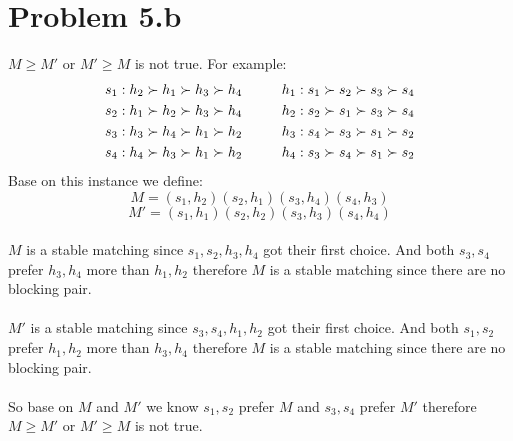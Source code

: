 \documentclass{article}
\newcommand\tab[1][1cm]{\hspace*{#1}}
\begin{document}
\section{Problem 5.b}
 $M \geq M'$ or $M' \geq M$ is not true. For example:\\
\begin{align*}
s_1: h_2 \succ h_1 \succ h_3 \succ h_4 \tab h_1: s_1 \succ s_2 \succ s_3 \succ s_4\\
s_2: h_1 \succ h_2 \succ h_3 \succ h_4 \tab h_2: s_2 \succ s_1 \succ s_3 \succ s_4\\
s_3: h_3 \succ h_4 \succ h_1 \succ h_2 \tab h_3: s_4 \succ s_3 \succ s_1 \succ s_2\\
s_4: h_4 \succ h_3 \succ h_1 \succ h_2 \tab h_4: s_3 \succ s_4 \succ s_1 \succ s_2\\
\end{align*}
Base on this instance we define:\\ 
$$M = (s_1,h_2)(s_2,h_1)(s_3,h_4)(s_4,h_3)$$
$$M' = (s_1,h_1)(s_2,h_2)(s_3,h_3)(s_4,h_4)$$\\
$M$ is a stable matching since $s_1, s_2, h_3, h_4$ got their first choice. And both $s_3,s_4$ prefer $h_3,h_4$ more than $h_1,h_2$ therefore $M$ is a stable matching since there are no blocking pair.\\\\
$M'$ is a stable matching since $s_3, s_4, h_1, h_2$ got their first choice. And both $s_1,s_2$ prefer $h_1,h_2$ more than $h_3,h_4$ therefore $M$ is a stable matching since there are no blocking pair.\\\\
So base on $M$ and $M'$ we know $s_1,s_2$ prefer $M$ and $s_3,s_4$ prefer $M'$ therefore $M \geq M'$ or $M' \geq M$ is not true.

\newpage
\end{document}
